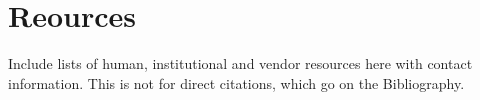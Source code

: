 \chapter{Reources}
\label{cha:resources}

Include lists of human, institutional and vendor resources here with contact information. This is not for direct citations, which go on the Bibliography.